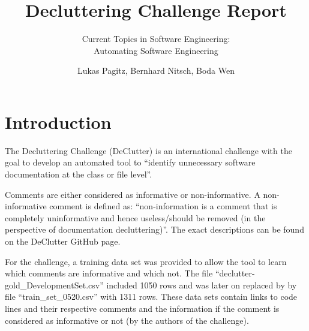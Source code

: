\documentclass[runningheads]{llncs}
\begin{document}
%
\title{Decluttering Challenge Report}
\subtitle{Current Topics in Software Engineering:\\Automating Software Engineering}
%
%
\author{Lukas Pagitz, Bernhard Nitsch, Boda Wen}
%
\authorrunning{ }
%
%
\maketitle              %
%
%
%
%


\section{Introduction}
The Decluttering Challenge (DeClutter) is an international challenge with the goal to develop an automated tool to ``identify unnecessary software documentation at the class or file level''. \cite{ref_declutter}

Comments are either considered as informative or non-informative. A non-informative comment is defined as: ``non-information is a comment that is completely uninformative and hence useless/should be removed (in the perspective of documentation decluttering)''.
The exact descriptions can be found on the DeClutter GitHub page.

For the challenge, a training data set was provided to allow the tool to learn which comments are informative and which not. The file ``declutter-gold\_DevelopmentSet.csv'' included 1050 rows and was later on replaced by by file ``train\_set\_0520.csv'' with 1311 rows. 
These data sets contain links to code lines and their respective comments and the information if the comment is considered as informative or not (by the authors of the challenge).

\end{document}
